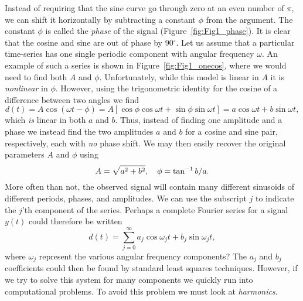 Instead of requiring that the sine curve go 
through zero at an even number of $\pi$, we can shift it horizontally by subtracting a constant $\phi$  
from the argument.
The constant $\phi$ is called the \emph{phase} of the signal (Figure~\ref{fig:Fig1_phase}).
It is clear that the cosine and sine are out of phase 
by 90$^\circ$.  Let us assume that a particular time-series has one single periodic component with angular 
frequency $\omega$.  An example of such a series is shown in Figure~\ref{fig:Fig1_onecos},
where we would need to find both $A$ and $\phi$.  Unfortunately, while this model is linear in $A$ it is \emph{nonlinear} 
in $\phi$.  However, using the trigonometric identity for the cosine of a difference between two angles we find
\noindent
\begin{equation}
d(t) = A\cos (\omega t -\phi ) = A [ \cos \phi \cos \omega t + \sin \phi \sin \omega t ] = a \cos \omega t + b \sin \omega t,
\label{eq:sinusoid}
\end{equation}
which \emph{is} linear in both $a$ and $b$.  Thus, instead of finding one amplitude and a phase we instead find the two 
amplitudes $a$ and $b$ for a cosine and sine pair, respectively, each with \emph{no} phase shift.  We may then easily recover the original
parameters $A$ and  $\phi$ using
\begin{equation}
	\index{Sinusoid!amplitude}
	\index{Amplitude!sinusoid}
	\index{Sinusoid!phase}
	\index{Phase!sinusoid}
A = \sqrt{a^2 + b^2 }, \quad \phi = \tan^{-1} b/a.
\end{equation}
	More often than not, the observed signal will contain many different sinusoids of different 
periods, phases, and amplitudes.  We can use the subscript $j$ to indicate the $j$'th component of the 
series.  Perhaps a complete Fourier series for a signal $y(t)$ could therefore be written
\begin{equation}
d(t) =  \sum^\infty_{j=0} a_{j} \cos \omega_{j}t + b_{j} \sin \omega_{j}t,
\end{equation}
where $\omega_j$ represent the various angular frequency components?  The $a_j$ and $b_j$ coefficients could then be found 
by standard least squares techniques.  However, if we try to solve this system for many 
components we quickly run into computational problems.  To avoid this problem we must look 
at \emph{harmonics}.

